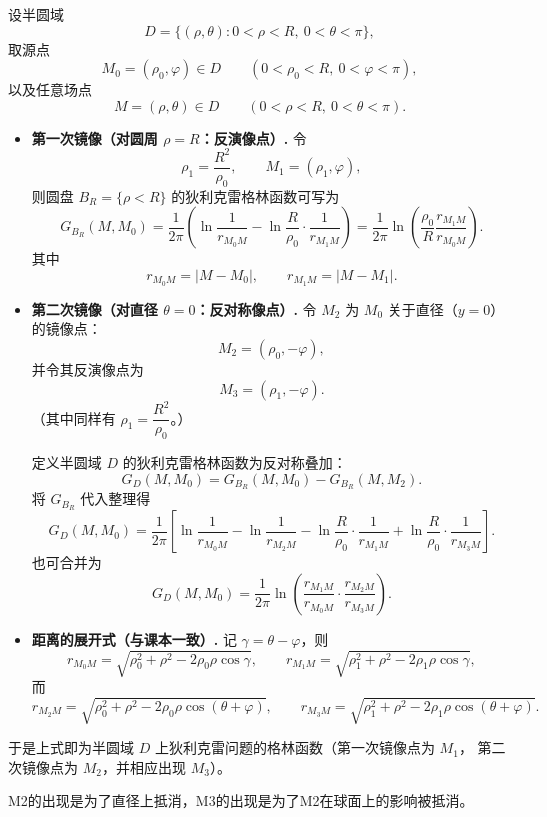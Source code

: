 \begin{solution}
设半圆域
\[
D=\{(\rho,\theta):0<\rho<R,\ 0<\theta<\pi\},
\]
取源点
\[
M_0=(\rho_0,\varphi)\in D\qquad (0<\rho_0<R,\ 0<\varphi<\pi),
\]
以及任意场点
\[
M=(\rho,\theta)\in D\qquad (0<\rho<R,\ 0<\theta<\pi).
\]

\begin{itemize}
\item \textbf{第一次镜像（对圆周 $\rho=R$：反演像点）.}
令
\[
\rho_1=\frac{R^2}{\rho_0},\qquad 
M_1=(\rho_1,\varphi),
\]
则圆盘 $B_R=\{\rho<R\}$ 的狄利克雷格林函数可写为
\[
G_{B_R}(M,M_0)
=\frac1{2\pi}\left(
\ln\frac1{r_{M_0M}}
-\ln\frac{R}{\rho_0}\cdot\frac1{r_{M_1M}}
\right)
=\frac1{2\pi}\ln\!\left(\frac{\rho_0}{R}\frac{r_{M_1M}}{r_{M_0M}}\right).
\]
其中
\[
r_{M_0M}=|M-M_0|,\qquad r_{M_1M}=|M-M_1|.
\]

\item \textbf{第二次镜像（对直径 $\theta=0$：反对称像点）.}
令 $M_2$ 为 $M_0$ 关于直径（$y=0$）的镜像点：
\[
M_2=(\rho_0,-\varphi),
\]
并令其反演像点为
\[
M_3=(\rho_1,-\varphi).
\]
（其中同样有 $\rho_1=\dfrac{R^2}{\rho_0}$。）

定义半圆域 $D$ 的狄利克雷格林函数为反对称叠加：
\[
\boxed{
\;G_D(M,M_0)=G_{B_R}(M,M_0)-G_{B_R}(M,M_2).\;
}
\]
将 $G_{B_R}$ 代入整理得
\[
\boxed{
\;
G_D(M,M_0)
=\frac1{2\pi}\left[
\ln\frac1{r_{M_0M}}
-\ln\frac1{r_{M_2M}}
-\ln\frac{R}{\rho_0}\cdot\frac1{r_{M_1M}}
+\ln\frac{R}{\rho_0}\cdot\frac1{r_{M_3M}}
\right].
\;}
\]
也可合并为
\[
\boxed{
\;
G_D(M,M_0)
=\frac1{2\pi}\ln\!\left(
\frac{r_{M_1M}}{r_{M_0M}}\cdot
\frac{r_{M_2M}}{r_{M_3M}}
\right).
\;}
\]

\item \textbf{距离的展开式（与课本一致）.}
记 $\gamma=\theta-\varphi$，则
\[
r_{M_0M}=\sqrt{\rho_0^{2}+\rho^{2}-2\rho_0\rho\cos\gamma},\qquad
r_{M_1M}=\sqrt{\rho_1^{2}+\rho^{2}-2\rho_1\rho\cos\gamma},
\]
而
\[
r_{M_2M}=\sqrt{\rho_0^{2}+\rho^{2}-2\rho_0\rho\cos(\theta+\varphi)},\qquad
r_{M_3M}=\sqrt{\rho_1^{2}+\rho^{2}-2\rho_1\rho\cos(\theta+\varphi)}.
\]
\end{itemize}

于是上式即为半圆域 $D$ 上狄利克雷问题的格林函数（第一次镜像点为 $M_1$，
第二次镜像点为 $M_2$，并相应出现 $M_3$）。
\end{solution}
\begin{dxtips}
    M2的出现是为了直径上抵消，M3的出现是为了M2在球面上的影响被抵消。
\end{dxtips}
